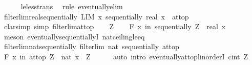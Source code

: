 \begin{isabellebody}
\ \ \ \ \isamarkupfalse%
\ le{\isacharunderscore}{\kern0pt}less{\isacharunderscore}{\kern0pt}trans\ \isamarkupfalse%
\ {\isacharparenleft}{\kern0pt}rule\ eventually{\isacharunderscore}{\kern0pt}elim{}{\isacharparenright}{\kern0pt}\isanewline
{}\isamarkupfalse%
%
\endisatagproof
{\isafoldproof}%
%
\isadelimproof
\isanewline
%
\endisadelimproof
\isanewline
{}\isamarkupfalse%
\ filterlim{\isacharunderscore}{\kern0pt}real{\isacharunderscore}{\kern0pt}sequentially{\isacharcolon}{\kern0pt}\ {\isachardoublequoteopen}LIM\ x\ sequentially{\isachardot}{\kern0pt}\ real\ x\ {\isacharcolon}{\kern0pt}{\isachargreater}{\kern0pt}\ at{\isacharunderscore}{\kern0pt}top{\isachardoublequoteclose}\isanewline
%
\isadelimproof
%
\endisadelimproof
%
\isatagproof
{}\isamarkupfalse%
\ {\isacharparenleft}{\kern0pt}clarsimp\ simp{\isacharcolon}{\kern0pt}\ filterlim{\isacharunderscore}{\kern0pt}at{\isacharunderscore}{\kern0pt}top{\isacharparenright}{\kern0pt}\isanewline
\ \ \isamarkupfalse%
\ Z\isanewline
\ \ \isamarkupfalse%
\ {\isachardoublequoteopen}{\isasymforall}\isactrlsub F\ x\ in\ sequentially{\isachardot}{\kern0pt}\ Z\ {\isasymle}\ real\ x{\isachardoublequoteclose}\isanewline
\ \ \ \ \isamarkupfalse%
\ {\isacharparenleft}{\kern0pt}meson\ eventually{\isacharunderscore}{\kern0pt}sequentiallyI\ nat{\isacharunderscore}{\kern0pt}ceiling{\isacharunderscore}{\kern0pt}le{\isacharunderscore}{\kern0pt}eq{\isacharparenright}{\kern0pt}\isanewline
{}\isamarkupfalse%
%
\endisatagproof
{\isafoldproof}%
%
\isadelimproof
\isanewline
%
\endisadelimproof
\isanewline
{}\isamarkupfalse%
\ filterlim{\isacharunderscore}{\kern0pt}nat{\isacharunderscore}{\kern0pt}sequentially{\isacharcolon}{\kern0pt}\ {\isachardoublequoteopen}filterlim\ nat\ sequentially\ at{\isacharunderscore}{\kern0pt}top{\isachardoublequoteclose}\isanewline
%
\isadelimproof
%
\endisadelimproof
%
\isatagproof
{}\isamarkupfalse%
\ {\isacharminus}{\kern0pt}\isanewline
\ \ \isamarkupfalse%
\ {\isachardoublequoteopen}{\isasymforall}\isactrlsub F\ x\ in\ at{\isacharunderscore}{\kern0pt}top{\isachardot}{\kern0pt}\ Z\ {\isasymle}\ nat\ x{\isachardoublequoteclose}\ \ Z\isanewline
\ \ \ \ \isamarkupfalse%
\ {\isacharparenleft}{\kern0pt}auto\ intro{\isacharbang}{\kern0pt}{\isacharcolon}{\kern0pt}\ eventually{\isacharunderscore}{\kern0pt}at{\isacharunderscore}{\kern0pt}top{\isacharunderscore}{\kern0pt}linorderI{\isacharbrackleft}{\kern0pt}\ c{\isacharequal}{\kern0pt}{\isachardoublequoteopen}int\ Z{\isachardoublequoteclose}{\isacharbrackright}{\kern0pt}{\isacharparenright}{\kern0pt}\isanewline

\end{isabellebody}
